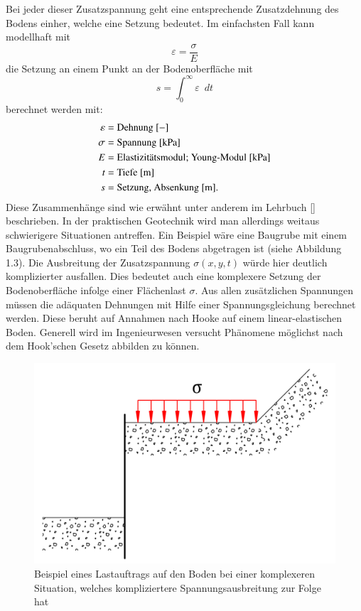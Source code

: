 Bei jeder dieser Zusatzspannung geht eine entsprechende Zusatzdehnung des Bodens einher, welche eine Setzung bedeutet.
Im einfachsten Fall kann modellhaft mit
\[
\varepsilon
=
\frac{\sigma}{E}
\]
die Setzung an einem Punkt an der Bodenoberfläche mit
\[
s
=
\int_{0}^{\infty}\varepsilon\enspace dt
\]
berechnet werden mit:
\begin{align*}
	\varepsilon &= \text{Dehnung [$-$]}                                     \\
	     \sigma &= \text{Spannung [\si{\kilo\pascal}]}                      \\
	          E &= \text{Elastizitätsmodul; Young-Modul [\si{\kilo\pascal}]}\\
	          t &= \text{Tiefe [\si{\meter}]}                               \\
	          s &= \text{Setzung, Absenkung [m].}
\end{align*}
Diese Zusammenhänge sind wie erwähnt unter anderem im  Lehrbuch [\cite{spannung:Grundlagen-der-Geotechnik}] beschrieben.
In der praktischen Geotechnik wird man allerdings weitaus schwierigere Situationen antreffen.
Ein Beispiel wäre eine Baugrube mit einem Baugrubenabschluss, wo ein Teil des Bodens abgetragen ist (siehe Abbildung 1.3).
Die Ausbreitung der Zusatzspannung $\sigma(x,y,t)$ würde hier deutlich komplizierter ausfallen.
Dies bedeutet auch eine komplexere Setzung der Bodenoberfläche infolge einer Flächenlast $\sigma$.
Aus allen zusätzlichen Spannungen müssen die adäquaten Dehnungen mit Hilfe einer Spannungsgleichung berechnet werden.
Diese beruht auf Annahmen nach Hooke auf einem linear-elastischen Boden.
Generell wird im Ingenieurwesen versucht Phänomene möglichst nach dem Hook'schen Gesetz abbilden zu können.

\begin{figure}
	\centering
	\includegraphics[width=0.45\linewidth,keepaspectratio]{papers/spannung/Grafiken/Bild3.png}
	\caption{Beispiel eines Lastauftrags auf den Boden bei einer komplexeren Situation, welches kompliziertere Spannungsausbreitung zur Folge hat}
	\label{fig:Bild3}
\end{figure}
